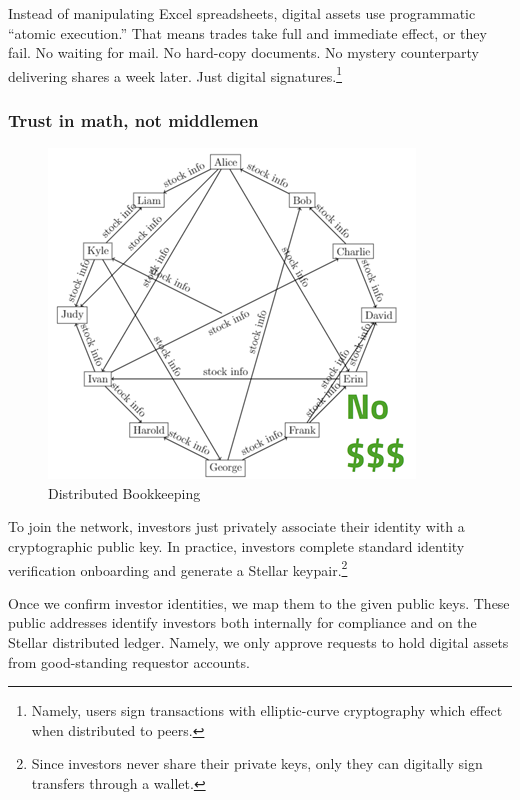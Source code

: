 \documentclass[11pt, english]{article}
\begin{document}
\begin{multicols}{2}
Instead of manipulating Excel spreadsheets, digital assets use programmatic ``atomic execution.'' That means trades take full and immediate effect, or they fail. No waiting for mail. No hard-copy documents. No mystery counterparty delivering shares a week later. Just digital signatures.\footnote{Namely, users sign transactions with elliptic-curve cryptography which effect when distributed to peers.}

\subsubsection{Trust in math, not middlemen}

\begin{figure}[H]
    \centering
    \includegraphics[width=\linewidth]{imgs/decentralized.png}
    \caption{Distributed Bookkeeping}
    \label{fig:decentralized}
\end{figure}

To join the network, investors just privately associate their identity with a cryptographic public key. In practice, investors complete standard identity verification onboarding and generate a Stellar keypair.\footnote{Since investors never share their private keys, only they can digitally sign transfers through a wallet.}

Once we confirm investor identities, we map them to the given public keys. These public addresses identify investors both internally for compliance and on the Stellar distributed ledger. Namely, we only approve requests to hold digital assets from good-standing requestor accounts.



\end{multicols}
\end{document}
